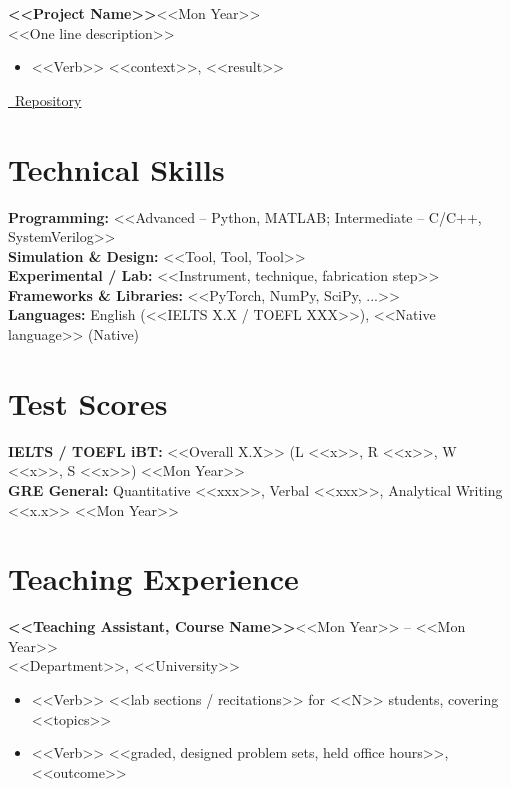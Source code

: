 \documentclass[a4paper,10pt]{article}
\newcommand{\entry}[2]{\textbf{#1}\hfill{#2}\\}
\begin{document}
\vspace{5pt}
\entry{<<Project Name>>}{<<Mon Year>>}
<<One line description>>
\begin{itemize}
  \item <<Verb>> <<context>>, <<result>>
\end{itemize}
\href{<<repo url>>}{\faGithub\ Repository}

\section{Technical Skills}
\textbf{Programming:} <<Advanced -- Python, MATLAB; Intermediate -- C/C++, SystemVerilog>>\\
\textbf{Simulation \& Design:} <<Tool, Tool, Tool>>\\
\textbf{Experimental / Lab:} <<Instrument, technique, fabrication step>>\\
\textbf{Frameworks \& Libraries:} <<PyTorch, NumPy, SciPy, ...>>\\
\textbf{Languages:} English (<<IELTS X.X / TOEFL XXX>>), <<Native language>> (Native)

\section{Test Scores}
\textbf{IELTS / TOEFL iBT:} <<Overall X.X>> \quad (L <<x>>, R <<x>>, W <<x>>, S <<x>>) \hfill <<Mon Year>>\\
\textbf{GRE General:} Quantitative <<xxx>>, Verbal <<xxx>>, Analytical Writing <<x.x>> \hfill <<Mon Year>>

\section{Teaching Experience}
\entry{<<Teaching Assistant, Course Name>>}{<<Mon Year>> -- <<Mon Year>>}
<<Department>>, <<University>>
\begin{itemize}
  \item <<Verb>> <<lab sections / recitations>> for <<N>> students, covering <<topics>>
  \item <<Verb>> <<graded, designed problem sets, held office hours>>, <<outcome>>
\end{itemize}
\end{document}
